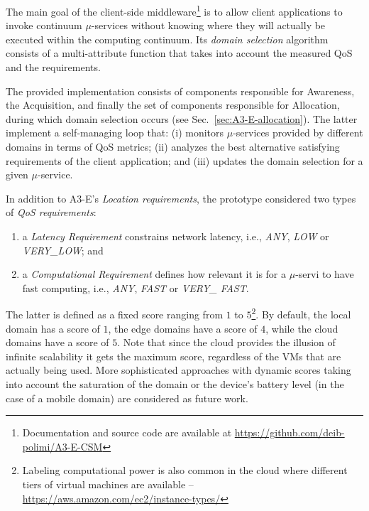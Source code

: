 The main goal of the client-side middleware\footnote{Documentation and source code are available at \url{https://github.com/deib-polimi/A3-E-CSM}} is to allow client applications to invoke continuum $\mu$-services without knowing where they will actually be executed within the computing continuum.
Its \textit{domain selection} algorithm consists of a multi-attribute function that takes into account the measured QoS and the requirements. %

The provided implementation consists of components responsible for Awareness, the Acquisition, and finally the set of  components responsible for Allocation, during which domain selection occurs (see Sec.~\ref{sec:A3-E-allocation}). The latter implement a self-managing loop that: (i) monitors $\mu$-services provided by different domains in terms of QoS metrics; (ii) analyzes the best alternative satisfying requirements of the client application; and (iii) updates the domain selection for a given $\mu$-service. 

In addition to A3-E's \textit{Location requirements}, the prototype considered two types of \textit{QoS requirements}:

\begin{enumerate}
	
	
	\item a \textit{Latency Requirement} constrains network latency, i.e., \textit{ANY}, \textit{LOW} or \textit{VERY\_LOW}; and 
	
	\item a \textit{Computational Requirement} defines how relevant it is for a $\mu$-servi to have fast computing, i.e., \textit{ANY}, \textit{FAST} or \textit{VERY\_ FAST}. 
\end{enumerate}

The latter is defined as a fixed score ranging from $1$ to $5$\footnote{Labeling computational power is also common in the cloud where different tiers of virtual machines are available -- \url{https://aws.amazon.com/ec2/instance-types/}}. By default, the local domain has a score of $1$, the edge domains have a score of $4$, while the cloud domains have a score of $5$. Note that since the cloud provides the illusion of infinite scalability it gets the maximum score, regardless of the VMs that are actually being used. More sophisticated approaches with dynamic scores taking into account the saturation of the domain or the device's battery level (in the case of a mobile domain) are considered as future work.

